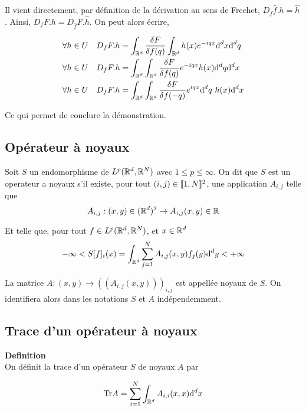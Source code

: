 \documentclass[10pt]{article}
\begin{document}
\begin{multicols}{2}
Il vient directement, par définition de la dérivation au sens de Frechet, $D_f\hat{f} .h = \hat{h}$.  
Ainsi,  $D_f F .h = D_{\hat{f}}F.\hat{h}$.  On peut alors écrire, 

\begin{align}
  \forall h \in U  \quad D_f F .h & = \int_{\mathbb{R}^d} \frac{\delta F}{\delta f(q)} \int_{\mathbb{R}^d} h(x) e^{-iqx} \text{d}^d x \text{d}^d q \\
  \forall h \in U  \quad D_f F .h & = \int_{\mathbb{R}^d} \int_{\mathbb{R}^d} \frac{\delta F}{\delta f(q)} e^{-iqx} h(x) \text{d}^d q \text{d}^d x \\
  \forall h \in U  \quad D_f F .h & = \int_{\mathbb{R}^d} \int_{\mathbb{R}^d} \frac{\delta F}{\delta f(-q)} e^{iqx} \text{d}^d q \text{ } h(x) \text{d}^d x
\end{align}

Ce qui permet de conclure la démonstration.

\vspace*{11pt}


\subsection{Opérateur à noyaux}

Soit $S$ un endomorphisme de $L^p(\mathbb{R}^d, \mathbb{R}^N)$ avec $1 \le p \le \infty$. On dit que $S$ est un operateur a noyaux s'il existe, pour tout $(i,j) \in  \llbracket 1,N \rrbracket ^2$, une application $A_{i,j}$ telle que 
\begin{equation}
A_{i,j} : (x,y) \in (\mathbb{R}^d)^2 \rightarrow A_{i,j}(x,y) \in \mathbb{R}
\end{equation}

Et telle que,  pour tout $f \in L^p(\mathbb{R}^d, \mathbb{R}^N)$, et $x \in \mathbb{R}^d$ 
\begin{equation}
 - \infty < S[f]_i (x) = \int_{\mathbb{R}^d} \sum_{j=1}^{N} A_{i,j}(x,y)f_j(y) \text{d}^d y < +  \infty
\end{equation}

La matrice $A : (x,y) \rightarrow ((A_{i,j}(x,y)))_{i,j}$ est appellée noyaux de $S$. On identifiera alors dans les notations $S$ et $A$ indépendemment.


\vspace*{11pt}

\subsection{Trace d'un opérateur à noyaux}

\textbf{Definition}\\
On définit la trace d'un opérateur $S$ de noyaux $A$ par

\begin{equation}
  \text{Tr} A = \sum_{i=1}^{N} \int_{\mathbb{R}^d} A_{i,i}(x,x) \text{d}^d x 
\end{equation}

\end{multicols}
\end{document}
